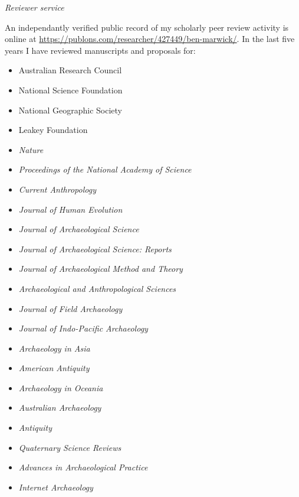 \medskip

\noindent\emph{Reviewer service\vspace{0.01in}}

\medskip

An independantly verified public record of my scholarly peer review activity is online at \href{https://publons.com/researcher/427449/ben-marwick}{https://publons.com/researcher/427449/ben-marwick/}. In the last five years I have reviewed manuscripts and proposals for:

\begin{itemize}[noitemsep, font=$\bullet$\scshape\bfseries]

\item  Australian Research Council

\item  National Science Foundation

\item  National Geographic Society

\item  Leakey Foundation

\item  \textit{Nature}

\item  \textit{Proceedings of the National Academy of Science}

\item  \textit{Current Anthropology}

\item  \textit{Journal of Human Evolution}

\item  \textit{Journal of Archaeological Science}

\item  \textit{Journal of Archaeological Science: Reports}

\item  \textit{Journal of Archaeological Method and Theory}

\item  \textit{Archaeological and Anthropological Sciences}

\item  \textit{Journal of Field Archaeology}

\item  \textit{Journal of Indo-Pacific Archaeology}

\item  \textit{Archaeology in Asia}

\item  \textit{American Antiquity}

\item  \textit{Archaeology in Oceania}

\item  \textit{Australian Archaeology}

\item  \textit{Antiquity}

\item  \textit{Quaternary Science Reviews}

\item  \textit{Advances in Archaeological Practice}

\item  \textit{Internet Archaeology}

\end{itemize}
